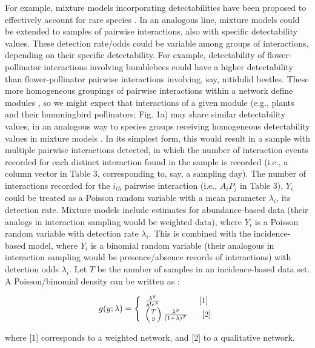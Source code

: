 \documentclass[12pt]{article}
\begin{document}
For example, mixture models incorporating detectabilities have been proposed to effectively account for rare species \citep{Mao:2005tka}. In an analogous line, mixture models could be extended to samples of pairwise interactions, also with specific detectability values. These detection rate\slash odds could be variable among groups of interactions, depending on their specific detectability. For example, detectability of flower-pollinator interactions involving bumblebees could have a higher detectability than flower-pollinator pairwise interactions involving, say, nitidulid beetles. These more homogeneous groupings of pairwise interactions within a network define modules \citep{Bascompte:2014to}, so we might expect that interactions of a given module (e.g., plants and their hummingbird pollinators; Fig. 1a) may share similar detectability values, in an analogous way to species groups receiving homogeneous detectability values in mixture models \citep{Mao:2005tka}. In its simplest form, this would result in a sample with multiple pairwise interactions detected, in which the number of interaction events recorded for each distinct interaction found in the sample is recorded (i.e., a column vector in Table 3, corresponding to, say, a sampling day). The number of interactions recorded for the $i_{th}$ pairwise interaction (i.e., $A_iP_j$ in Table 3), $Y_i$ could be treated as a Poisson random variable with a mean parameter $\lambda_i$, its detection rate. Mixture models \citep{Mao:2005tka} include estimates for abundance-based data (their analogs in interaction sampling would be weighted data), where $Y_i$ is a Poisson random variable with detection rate $\lambda_i$. This is combined with the incidence-based model, where $Y_i$ is a binomial random variable (their analogous in interaction sampling would be presence\slash absence records of interactions) with detection odds $\lambda_i$. Let $T$ be the number of samples in an incidence-based data set. A Poisson\slash binomial density can be written as \citep{Mao:2005tka}:

\[ 
g(y;\lambda) =  \left\{
\begin{array}{ll}
\frac{\lambda^y}{y!e^{\lambda}} \ \ \ \ \ \ \ \ \ \ \ \ \ \ [1]\\
\left({T\above 0pt y}\right) \frac{\lambda^y}{(1+\lambda)^T} \ \ \ \ \ [2]
\end{array}%
\right.
\]

where [1] corresponds to a weighted network, and [2] to a qualitative network.
\end{document}
